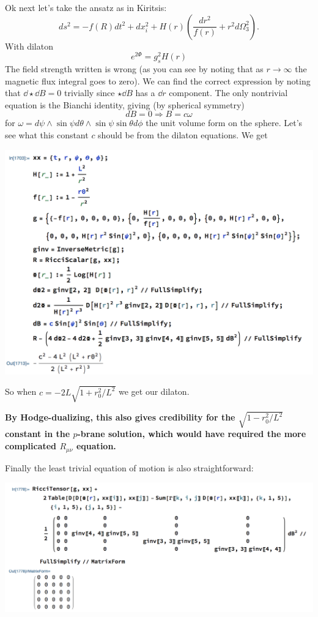 \documentclass[11pt, class=article, crop=false]{standalone}
\begin{document}
\begin{enumerate}
	Ok next let's take the ansatz as in Kiritsis:
	\[
		ds^2 = - f(R) dt^2 + dx_i^2 + H(r) \left(\frac{dr^2}{f(r)} + r^2 d\Omega_3^2 \right).
	\]
	With dilaton
	\[
		e^{2 \Phi} = g_s^2 H(r)
	\]
	The field strength written is wrong (as you can see by noting that as $r\to \infty$ the magnetic flux integral goes to zero). We can find the correct expression by noting that $\dd \star \dd B = 0$ trivially since $\star \dd B$ has a $\dd r$ component. The only nontrivial equation is the Bianchi identity, giving (by spherical symmetry)
	\[
		dB = 0 \Rightarrow B = c \omega 
	\]
	for $\omega = d\psi \wedge \sin \psi d\theta \wedge \sin \psi \sin \theta d \phi$ the unit volume form on the sphere. Let's see what this constant $c$ should be from the dilaton equations. We get
	\begin{center}
		\includegraphics[scale=0.5]{"Figures/NS5 Dilaton"}
	\end{center}
	So when $c = -  2L\sqrt{1 + r_0^2/L^2}$ we get our dilaton. 
	
	\textbf{By Hodge-dualizing, this also gives credibility for the $\sqrt{1-r_0^2/L^2}$ constant in the $p$-brane solution, which would have required the more complicated $R_{\mu \nu}$ equation.}
	
	Finally the least trivial equation of motion is also straightforward:
	\begin{center}
		\includegraphics[scale=0.5]{"Figures/NS5 Dilaton 2"}
	\end{center}
	

\end{enumerate}
\end{document}
